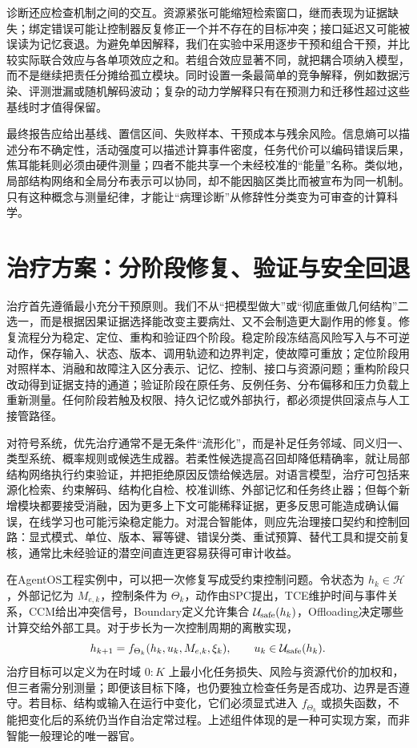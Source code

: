 诊断还应检查机制之间的交互。资源紧张可能缩短检索窗口，继而表现为证据缺失；绑定错误可能让控制器反复修正一个并不存在的目标冲突；接口延迟又可能被误读为记忆衰退。为避免单因解释，我们在实验中采用逐步干预和组合干预，并比较实际联合效应与各单项效应之和。若组合效应显著不同，就把耦合项纳入模型，而不是继续把责任分摊给孤立模块。同时设置一条最简单的竞争解释，例如数据污染、评测泄漏或随机解码波动；复杂的动力学解释只有在预测力和迁移性超过这些基线时才值得保留。

最终报告应给出基线、置信区间、失败样本、干预成本与残余风险。信息熵可以描述分布不确定性，活动强度可以描述计算事件密度，任务代价可以编码错误后果，焦耳能耗则必须由硬件测量；四者不能共享一个未经校准的“能量”名称。类似地，局部结构网络和全局分布表示可以协同，却不能因脑区类比而被宣布为同一机制。只有这种概念与测量纪律，才能让“病理诊断”从修辞性分类变为可审查的计算科学。

\section{治疗方案：分阶段修复、验证与安全回退}
\label{sec:section_3455}

治疗首先遵循最小充分干预原则。我们不从“把模型做大”或“彻底重做几何结构”二选一，而是根据因果证据选择能改变主要病灶、又不会制造更大副作用的修复。修复流程分为稳定、定位、重构和验证四个阶段。稳定阶段冻结高风险写入与不可逆动作，保存输入、状态、版本、调用轨迹和边界判定，使故障可重放；定位阶段用对照样本、消融和故障注入区分表示、记忆、控制、接口与资源问题；重构阶段只改动得到证据支持的通道；验证阶段在原任务、反例任务、分布偏移和压力负载上重新测量。任何阶段若触及权限、持久记忆或外部执行，都必须提供回滚点与人工接管路径。

对符号系统，优先治疗通常不是无条件“流形化”，而是补足任务邻域、同义归一、类型系统、概率规则或候选生成器。若柔性候选提高召回却降低精确率，就让局部结构网络执行约束验证，并把拒绝原因反馈给候选层。对语言模型，治疗可包括来源化检索、约束解码、结构化自检、校准训练、外部记忆和任务终止器；但每个新增模块都要接受消融，因为更多上下文可能稀释证据，更多反思可能造成确认偏误，在线学习也可能污染稳定能力。对混合智能体，则应先治理接口契约和控制回路：显式模式、单位、版本、幂等键、错误分类、重试预算、替代工具和提交前复核，通常比未经验证的潜空间直连更容易获得可审计收益。

在AgentOS工程实例中，可以把一次修复写成受约束控制问题。令状态为 \(h_k\in\mathcal H\)，外部记忆为 \(M_{e,k}\)，控制条件为 \(\Theta_k\)，动作由SPC提出，TCE维护时间与事件关系，CCM给出冲突信号，Boundary定义允许集合 \(\mathcal U_{\rm safe}(h_k)\)，Offloading决定哪些计算交给外部工具。对于步长为一次控制周期的离散实现，
\[
  h_{k+1}=f_{\Theta_k}(h_k,u_k,M_{e,k},\xi_k),\qquad
  u_k\in\mathcal U_{\rm safe}(h_k).
\]
治疗目标可以定义为在时域 \(0{:}K\) 上最小化任务损失、风险与资源代价的加权和，但三者需分别测量；即便该目标下降，也仍要独立检查任务是否成功、边界是否遵守。若目标、结构或输入在运行中变化，它们必须显式进入 \(f_{\Theta_k}\) 或损失函数，不能把变化后的系统仍当作自治定常过程。上述组件体现的是一种可实现方案，而非智能一般理论的唯一器官。

